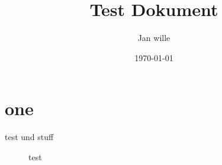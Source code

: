 \documentclass[11pt,ngerman,twoside]{HsH-report}
\title{Test Dokument}
\author{Jan wille}
\date{\today}
\begin{document}
\maketitle

\begin{abstract}
    \lipsum[5-8]
\end{abstract}

\tableofcontents

\chapter{one}
    {\color{red}test} und stuff
    \begin{figure}

        \caption{test}
    \end{figure}

\listoffigures
\end{document}
